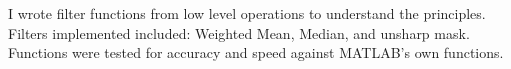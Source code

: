 \descript{ }
\vspace*{-\topsep}  %
\begin{justify}
I wrote filter functions from low level operations to understand the principles. Filters implemented included: Weighted Mean, Median, and unsharp mask. Functions were tested for accuracy and speed against MATLAB's own functions.
\end{justify}
